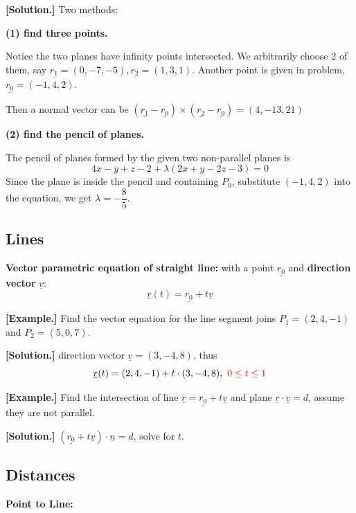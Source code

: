 \documentclass[11pt, a4paper]{MATH2023}
\newcommand{\eg}{\textbf{[Example.] }}
\newcommand{\sol}{\textbf{[Solution.] }}
\newcommand{\vct}{\underline}
\newcommand{\vv}{\underline{v}}
\begin{document}
\begin{spacing}{1.3}
    \sol Two methods: 

    {\bf (1) find three points.} 

    Notice the two planes have infinity points intersected. 
    We arbitrarily choose 2 of them, say 
    $\vct{r_1}=(0,-7,-5), \vct{r_2}=(1,3,1)$. Another point is given in problem,
    $\vct{r_0}=(-1,4,2)$.

    Then a normal vector can be 
    $(\vct{r_1}-\vct{r_0})\times (\vct{r_2}-\vct{r_0})=(4,-13,21)$

    {\bf (2) find the pencil of planes.}

    The pencil of planes formed by the given two non-parallel planes is 
    $$4x-y+z-2+\lambda(2x+y-2z-3)=0$$
    Since the plane is inside the pencil and containing $P_0$,
    substitute $(-1,4,2)$ into the equation, we get $\lambda=-\dfrac{8}{5}.$

    \subsection{Lines}

    {\bf Vector parametric equation of straight line:} with a point 
    $\vct{r_0}$ and {\bf direction vector }$\vv$: 
    $$\vct{r}(t)=\vct{r_0}+t\vv$$

    \eg Find the vector equation for the line segment joins $P_1=(2,4,-1)$
    and $P_2=(5,0,7)$.

    \sol direction vector $\vv=(3,-4,8)$, thus 
    $$\vct{r}(t)=(2,4,-1)+t\cdot (3,-4,8),\ \red{0\le t\le 1}$$

    \eg Find the intersection of line $\vct{r}=\vct{r_0}+t\vct{v}$ 
    and plane $\vct{r}\cdot \vv=d$, assume they are not parallel.

    \sol $(\vct{r_0}+t\vv)\cdot \vct{n}=d$, solve for $t$.

    \subsection{Distances}

    {\bf Point to Line:} 


\end{spacing}
\end{document}
